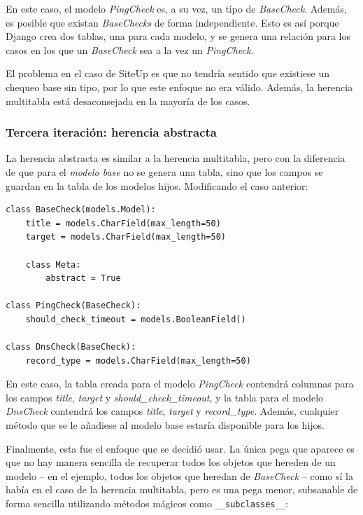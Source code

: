 En este caso, el modelo \textit{PingCheck} es, a su vez, un tipo de
\textit{BaseCheck}. Además, es posible que existan \textit{BaseChecks} de forma
independiente. Esto es así porque Django crea dos tablas, una para cada modelo,
y se genera una relación para los casos en los que un \textit{BaseCheck} sea a la
vez un \textit{PingCheck}.

El problema en el caso de SiteUp es que no tendría sentido que existiese un
chequeo base sin tipo, por lo que este enfoque no era válido. Además, la
herencia multitabla está desaconsejada en la mayoría de los casos.

\subsubsection{Tercera iteración: herencia abstracta}

La herencia abstracta es similar a la herencia multitabla, pero con la
diferencia de que para el \textit{modelo base} no se genera una tabla, sino que
los campos se guardan en la tabla de los modelos hijos. Modificando el caso
anterior:

\begin{verbatim}
class BaseCheck(models.Model):
    title = models.CharField(max_length=50)
    target = models.CharField(max_length=50)

    class Meta:
        abstract = True

class PingCheck(BaseCheck):
    should_check_timeout = models.BooleanField()

class DnsCheck(BaseCheck):
    record_type = models.CharField(max_length=50)

\end{verbatim}

En este caso, la tabla creada para el modelo \textit{PingCheck} contendrá
columnas para los campos \textit{title}, \textit{target} y
\textit{should\_check\_timeout}, y la tabla para el modelo \textit{DnsCheck} contendrá
los campos \textit{title}, \textit{target} y
\textit{record\_type}. Además, cualquier método que se le añadiese al modelo
base estaría disponible para los hijos.

Finalmente, esta fue el enfoque que se decidió usar. La única pega que aparece
es que no hay manera sencilla de recuperar todos los objetos que hereden de un
modelo -- en el ejemplo, todos los objetos que heredan de \textit{BaseCheck} --
como sí la había en el caso de la herencia multitabla, pero es una pega menor,
subsanable de forma sencilla utilizando métodos mágicos como
\texttt{\_\_subclasses\_\_}:

